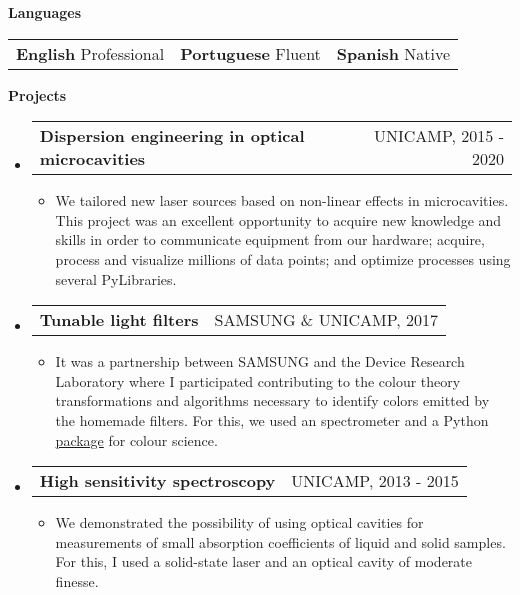 \documentclass[letterpaper,12pt]{article}[leftmargin=*]
\makeatletter
\def \entryspacing {-0pt}
\renewcommand{\section}[2]{\vspace{5pt}
  \colorbox{secondary}{\color{white}\raggedbottom\normalsize\textbf{{#1}{\hspace{7pt}#2}}}
}
\newcommand{\resumeEntryStart}{\begin{itemize}[leftmargin=2.5mm]}
\newcommand{\resumeEntryEnd}{\end{itemize}\vspace{\entryspacing}}
\newcommand{\resumeItemListStart}{\begin{itemize}[leftmargin=4.5mm]}
\newcommand{\resumeItemListEnd}{\end{itemize}}
\newcommand{\resumeItem}[1]{
  \item\small{
    {#1 \vspace{-2pt}}
  }
}
\newcommand{\resumeEntryTD}[2]{
  \vspace{-1pt}\item[]
    \begin{tabularx}{0.97\textwidth}{X@{\hspace{60pt}}r}
      \textbf{\color{primary}#1} & {\firabook\color{accent}\small#2} \\
    \end{tabularx}\vspace{-6pt}
}
\newcommand{\resumeEntryS}[2]{
  \item[]\small{
    \textbf{\color{primary}#1 }{ #2 \vspace{-6pt}}
  }
}
\newcommand{\triplecol}[3]{
	\begin{tabularx}{\textwidth}{XXX}
	{\small#1} & {\small#2} & {\small#3}\\
	\end{tabularx}
}
\makeatother
\begin{document}
\section{\faComment}{Languages}
\vspace{-0.5cm}
\resumeEntryStart
	\triplecol{\resumeEntryS{English} {Professional}}{\resumeEntryS{Portuguese}{Fluent}}{\resumeEntryS{Spanish}{Native}}
\resumeEntryEnd
\vspace{-0.1cm}

\section{\faFlask}{Projects}
\vspace{-0.1cm}

\resumeEntryStart
\resumeEntryTD
{Dispersion engineering in optical microcavities}{UNICAMP, 2015 - 2020}
\resumeItemListStart
\resumeItem{We tailored new laser sources based on non-linear effects in microcavities. This project was an excellent opportunity to acquire new knowledge and skills in order to communicate equipment from our hardware; acquire, process and visualize millions of data points; and optimize processes using several PyLibraries.}
\resumeItemListEnd
\resumeEntryEnd

\vspace{-0.5cm}

\resumeEntryStart
\resumeEntryTD
{Tunable light filters}{SAMSUNG \& UNICAMP, 2017}
\resumeItemListStart
\resumeItem {It was a partnership between SAMSUNG and the Device Research Laboratory where I participated contributing to the colour theory transformations and algorithms necessary to identify colors emitted by the homemade filters. For this, we used an spectrometer and a Python \href{https://www.colour-science.org/}{package} for colour science.}
\resumeItemListEnd
\resumeEntryEnd

\vspace{-0.5cm}

\resumeEntryStart
\resumeEntryTD
{High sensitivity spectroscopy}{UNICAMP, 2013 - 2015}
\resumeItemListStart
\resumeItem{We demonstrated the possibility of using optical cavities for measurements of small absorption coefficients of liquid and solid samples. For this, I used a solid-state laser and an optical cavity of moderate finesse.}
\resumeItemListEnd
\resumeEntryEnd
\end{document}
